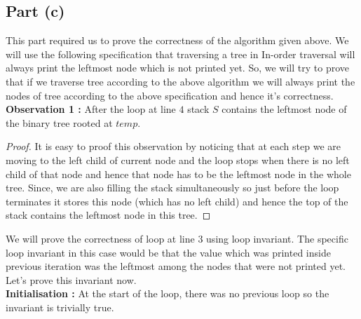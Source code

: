 \documentclass{article}
\begin{document}
{    \subsection {Part (c)} {
        This part required us to prove the correctness of the algorithm given above. We will use the following specification that traversing a tree in In-order traversal will always print the leftmost node which is not printed yet. So, we will try to prove that if we traverse tree according to the above algorithm we will always print the nodes of tree according to the above specification and hence it's correctness. \newline \\
        \textbf{Observation 1 :} After the loop at line $4$ stack $S$ contains the leftmost node of the binary tree rooted at $temp$. 
        \begin{proof}
        It is easy to proof this observation by noticing that at each step we are moving to the left child of current node and the loop stops when there is no left child of that node and hence that node has to be the leftmost node in the whole tree. Since, we are also filling the stack simultaneously so just before the loop terminates it stores this node (which has no left child) and hence the top of the stack contains the leftmost node in this tree.
        \end{proof}
        \noindent We will prove the correctness of loop at line $3$ using loop invariant. The specific loop invariant in this case would be that the value which was printed inside previous iteration was the leftmost among the nodes that were not printed yet. Let's prove this invariant now. \newline \\
        \textbf{Initialisation :} At the start of the loop, there was no previous loop so the invariant is trivially true. \\
        
}}
\end{document}
